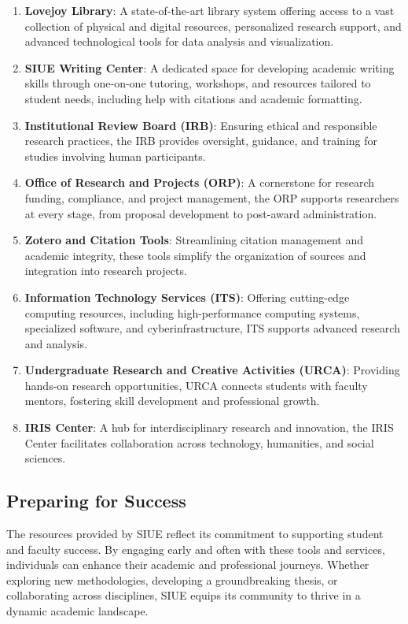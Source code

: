 \documentclass[
]{book}
\providecommand{\tightlist}{%
  \setlength{\itemsep}{0pt}\setlength{\parskip}{0pt}}
\begin{document}
\begin{enumerate}
\def\labelenumi{\arabic{enumi}.}
\tightlist
\item
  \textbf{Lovejoy Library}: A state-of-the-art library system offering access to a vast collection of physical and digital resources, personalized research support, and advanced technological tools for data analysis and visualization.
\item
  \textbf{SIUE Writing Center}: A dedicated space for developing academic writing skills through one-on-one tutoring, workshops, and resources tailored to student needs, including help with citations and academic formatting.
\item
  \textbf{Institutional Review Board (IRB)}: Ensuring ethical and responsible research practices, the IRB provides oversight, guidance, and training for studies involving human participants.
\item
  \textbf{Office of Research and Projects (ORP)}: A cornerstone for research funding, compliance, and project management, the ORP supports researchers at every stage, from proposal development to post-award administration.
\item
  \textbf{Zotero and Citation Tools}: Streamlining citation management and academic integrity, these tools simplify the organization of sources and integration into research projects.
\item
  \textbf{Information Technology Services (ITS)}: Offering cutting-edge computing resources, including high-performance computing systems, specialized software, and cyberinfrastructure, ITS supports advanced research and analysis.
\item
  \textbf{Undergraduate Research and Creative Activities (URCA)}: Providing hands-on research opportunities, URCA connects students with faculty mentors, fostering skill development and professional growth.
\item
  \textbf{IRIS Center}: A hub for interdisciplinary research and innovation, the IRIS Center facilitates collaboration across technology, humanities, and social sciences.
\end{enumerate}

\subsection*{Preparing for Success}\label{preparing-for-success}

The resources provided by SIUE reflect its commitment to supporting student and faculty success. By engaging early and often with these tools and services, individuals can enhance their academic and professional journeys. Whether exploring new methodologies, developing a groundbreaking thesis, or collaborating across disciplines, SIUE equips its community to thrive in a dynamic academic landscape.
\end{document}

